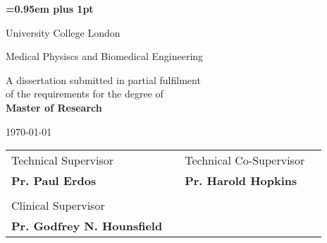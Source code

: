 \begin{titlepage}

\pagestyle{empty}


\vspace*{1.5cm}

\begin{center}
	{\LARGE{\theauthor}\par}
\end{center}
\vspace{0.6cm}
\begin{center}
        {\huge\bf \baselineskip=0.95em plus 1pt \expandafter{
        \thetitle
        \par}}
\end{center}


\vspace{3cm}

\begin{center}
	\LARGE{\rm\expandafter{University College London}}\par
	\expandafter{\Large{Medical Physiscs and Biomedical Engineering}\par}
\end{center}

\vspace{1.5cm}

\begin{center}
	A dissertation submitted in partial fulfilment 
	\\
	of the requirements for the degree of
	\\ 
	{\bf Master of Research}	
\end{center}

\vspace{0.2cm}
\begin{center}
	\today
\end{center}

\vspace{1.0cm}

\begin{center}
\begin{tabular}{l p{3.3cm} l l}
	
Technical Supervisor & & Technical Co-Supervisor \\
\textbf{Pr. Paul Erdos} & & \textbf{Pr. Harold Hopkins}  \\
 & & \\
Clinical Supervisor & & \\
\textbf{Pr. Godfrey N. Hounsfield} & & 
	
\end{tabular}
\end{center}

\end{titlepage} 